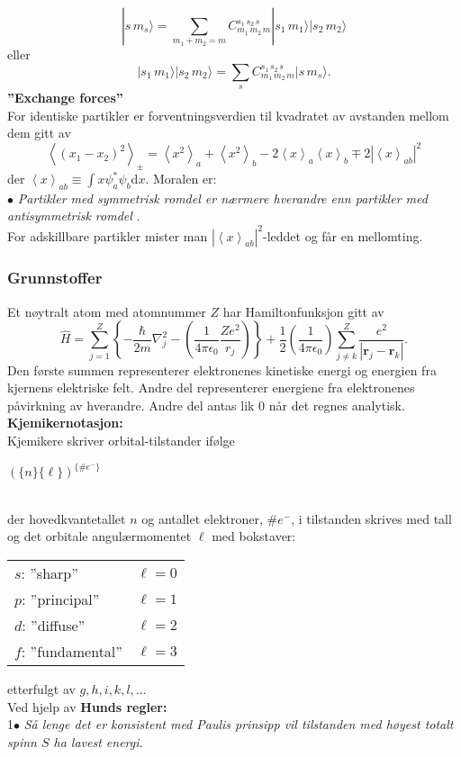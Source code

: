 \documentclass[a4paper, norsk, 8pt]{article}
\newcommand{\expe}[1] { \left\langle#1\right\rangle }
\newcommand{\ket}[1] { |#1\rangle }
\begin{document}
\begin{multicols*}{3}
\[\ket{s \, m_s}=\sum_{m_1+m_2=m}C_{m_1 \, m_2 \, m}^{s_1 \, s_2 \, s}\ket{s_1 \, m_1}\ket{s_2 \, m_2}\]eller \[\ket{s_1 \, m_1}\ket{s_2 \, m_2}=\sum_{s}C_{m_1 \, m_2 \, m}^{s_1 \, s_2 \, s}\ket{s \, m_s}.\]
\textbf{''Exchange forces''}\\
For identiske partikler er forventningsverdien til kvadratet av avstanden mellom dem gitt av
\[ \expe{(x_1-x_2)^2}_{\pm}=\expe{x^2}_a+\expe{x^2}_b-2\expe{x}_a\expe{x}_b\mp2|\expe{x}_{ab}|^2 \]
der $\expe{x}_{ab}\equiv \int x \psi_a^* \psi_b \mbox{d} x$. Moralen er: \\
$\bullet$ \textit{Partikler med symmetrisk romdel er nærmere hverandre enn partikler med antisymmetrisk romdel }. \\
For adskillbare partikler mister man $|\expe{x}_{ab}|^2$-leddet og får en mellomting.
\subsubsection*{\scriptsize Grunnstoffer}
Et nøytralt atom med atomnummer $Z$ har Hamiltonfunksjon gitt av
\[ \hat{H}=\sum_{j=1}^{Z}\left\{ -\frac{\hbar}{2m}\nabla^2_j-\left(\frac{1}{4\pi\epsilon_0}\frac{Ze^2}{r_j}\right)\right\}+\frac{1}{2}\left(\frac{1}{4\pi\epsilon_0}\right)\sum_{j\neq k}^{Z}\frac{e^2}{|\mathbf{r}_j-\mathbf{r}_k|}. \]
Den første summen representerer elektronenes kinetiske energi og energien fra kjernens elektriske felt. Andre del representerer energiene fra elektronenes påvirkning av hverandre. Andre del antas lik 0 når det regnes analytisk. \\
\textbf{Kjemikernotasjon:}\\
Kjemikere skriver orbital-tilstander ifølge \\
\centerline{ $(\{n\}\{\ell\})^{\{\# e^- \}}$ } \\
der hovedkvantetallet $n$ og antallet elektroner, $\# e^-$, i tilstanden skrives med tall og det orbitale angulærmomentet $\ell$ med bokstaver: \\
\begin{tabular}{l l}
$s$: ''sharp''  		&$\ell=0$ \\
$p$: ''principal'' 		&$\ell=1$ \\
$d$: ''diffuse'' 		&$\ell=2$ \\
$f$: ''fundamental'' 	&$\ell=3$ \\
\end{tabular}
etterfulgt av $g,h,i,k,l,...$\\
Ved hjelp av \textbf{Hunds regler:}\\
1$\bullet$ \textit{ Så lenge det er konsistent med Paulis prinsipp vil tilstanden med høyest totalt spinn $S$ ha lavest energi.}\\

\end{multicols*}
\end{document}
